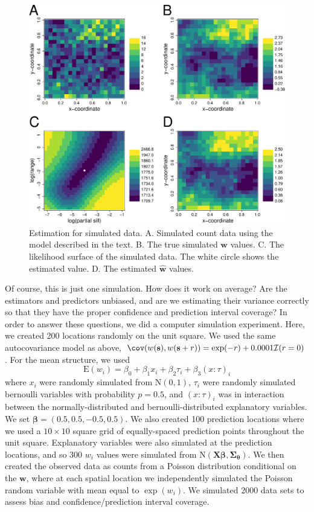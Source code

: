 \documentclass[12pt, titlepage]{article}
\begin{document}
\begin{figure}[H]
  \begin{center}
	    \includegraphics[width=.8\linewidth]{figures/pois_likelihood_estimation}
  \end{center}
  \caption{Estimation for simulated data. A. Simulated count data using the model described in the text.  B. The true simulated $\mathbf{w}$ values. C. The likelihood surface of the simulated data.  The white circle shows the estimated value.  D. The estimated $\hat{\mathbf{w}}$ values. \label{Fig:sglm_likelihood_estimation}}
\end{figure}

Of course, this is just one simulation.  How does it work on average?  Are the estimators and predictors unbiased, and are we estimating their variance correctly so that they have the proper confidence and prediction interval coverage?  In order to answer these questions, we did a computer simulation experiment.  Here, we created 200 locations randomly on the unit square. We used the same autocovariance model as above, $\cov(w(\mathbf{s}),w(\mathbf{s} + r)) = \exp(-r) + 0.0001\mathcal{I}(r = 0)$.  For the mean structure, we used
$$
\textrm{E}(w_{i}) = \beta_{0} + \beta_{1}x_{i} + \beta_{2}\tau_{i} + \beta_{3}(x{:}\tau)_{i}
$$
where $x_{i}$ were randomly simulated from $\textrm{N}(0,1)$, $\tau_{i}$ were randomly simulated bernoulli variables with probability $p = 0.5$, and $(x{:}\tau)_{i}$ was in interaction between the normally-distributed and bernoulli-distributed explanatory variables.  We set $\mathbf{\beta} = (0.5, 0.5, -0.5, 0.5)$.  We also created 100 prediction locations where we used a $10 \times 10$ square grid of equally-spaced prediction points throughout the unit square.  Explanatory variables were also simulated at the prediction locations, and so 300 $w_{i}$ values were simulated from $\textrm{N}(\mathbf{X}\boldsymbol{\beta},\boldsymbol{\Sigma}_{\boldsymbol{\theta}})$. We then created the observed data as counts from a Poisson distribution conditional on the $\mathbf{w}$, where at each spatial location we independently simulated the Poisson random variable with mean equal to $\exp(w_{i})$.  We simulated 2000 data sets to assess bias and confidence/prediction interval coverage.
\end{document}
